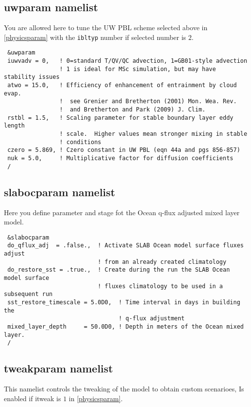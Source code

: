 \subsection{uwparam namelist}

You are allowed here to tune the UW PBL scheme selected above in
\ref{physicsparam} with the \verb=ibltyp= number if selected number is
$2$. 

{\footnotesize
\begin{Verbatim}
 &uwparam
 iuwvadv = 0,   ! 0=standard T/QV/QC advection, 1=GB01-style advection
                ! 1 is ideal for MSc simulation, but may have stability issues
 atwo = 15.0,   ! Efficiency of enhancement of entrainment by cloud evap.
                !  see Grenier and Bretherton (2001) Mon. Wea. Rev.
                !  and Bretherton and Park (2009) J. Clim.
 rstbl = 1.5,   ! Scaling parameter for stable boundary layer eddy length
                ! scale.  Higher values mean stronger mixing in stable 
                ! conditions
 czero = 5.869, ! Czero constant in UW PBL (eqn 44a and pgs 856-857)
 nuk = 5.0,     ! Multiplicative factor for diffusion coefficients
 /
\end{Verbatim}
}

\subsection{slabocparam namelist}

Here you define parameter and stage fot the Ocean q-flux adjusted mixed layer
model.

{\footnotesize
\begin{Verbatim}
 &slabocparam
 do_qflux_adj  = .false.,  ! Activate SLAB Ocean model surface fluxes adjust
                           ! from an already created climatology
 do_restore_sst = .true.,  ! Create during the run the SLAB Ocean model surface
                           ! fluxes climatology to be used in a subsequent run
 sst_restore_timescale = 5.0D0,  ! Time interval in days in building the
                                 ! q-flux adjustment
 mixed_layer_depth     = 50.0D0, ! Depth in meters of the Ocean mixed layer.
 /
\end{Verbatim}
}

\subsection{tweakparam namelist}

This namelist controls the tweaking of the model to obtain custom scenarioes,
Is enabled if itweak is $1$ in \ref{physicsparam}.

